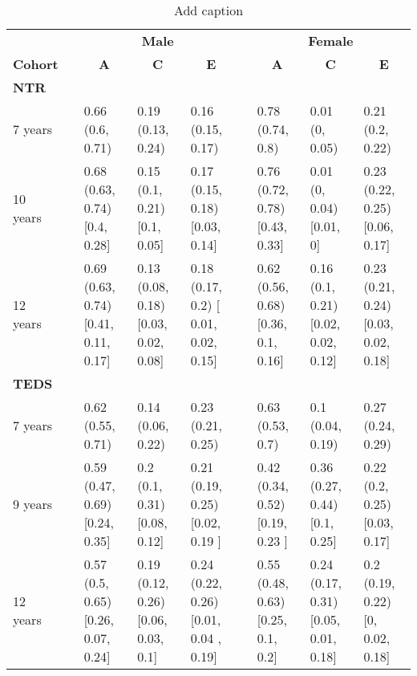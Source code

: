 \begin{table}[htbp]
  \centering
  \caption{Add caption}
    \begin{tabular}{lrlllrlll}
    \toprule
          &       & \multicolumn{3}{c}{\textbf{Male}} &       & \multicolumn{3}{c}{\textbf{Female}} \\
\cmidrule{3-5}\cmidrule{7-9}    \multicolumn{1}{c}{\textbf{Cohort}} &       & \multicolumn{1}{c}{\textbf{A}} & \multicolumn{1}{c}{\textbf{C}} & \multicolumn{1}{c}{\textbf{E}} &       & \multicolumn{1}{c}{\textbf{A}} & \multicolumn{1}{c}{\textbf{C}} & \multicolumn{1}{c}{\textbf{E}} \\
    \midrule
    \multicolumn{9}{l}{\textbf{NTR}} \\
    7 years &       & 0.66 (0.6, 0.71)  & 0.19 (0.13, 0.24)  & 0.16 (0.15, 0.17)  &       & 0.78 (0.74, 0.8)  & 0.01 (0, 0.05)  & 0.21 (0.2, 0.22)  \\
    10 years &       & 0.68 (0.63, 0.74)     [0.4, 0.28] & 0.15 (0.1, 0.21) [0.1, 0.05] & 0.17 (0.15, 0.18) [0.03, 0.14] &       & 0.76 (0.72, 0.78) [0.43, 0.33] & 0.01 (0, 0.04) [0.01, 0] & 0.23 (0.22, 0.25) [0.06, 0.17] \\
    12 years &       & 0.69 (0.63, 0.74) [0.41, 0.11, 0.17] & 0.13 (0.08, 0.18) [0.03, 0.02, 0.08] & 0.18 (0.17, 0.2) [ 0.01, 0.02, 0.15] &       & 0.62 (0.56, 0.68) [0.36, 0.1, 0.16] & 0.16 (0.1, 0.21) [0.02, 0.02, 0.12] & 0.23 (0.21, 0.24) [0.03, 0.02, 0.18] \\
    \multicolumn{9}{l}{\textbf{TEDS}} \\
    7 years &       & 0.62 (0.55, 0.71)  & 0.14 (0.06, 0.22) & 0.23 (0.21, 0.25) &       & 0.63 (0.53, 0.7) & 0.1 (0.04, 0.19) & 0.27 (0.24, 0.29) \\
    9 years &       & 0.59 (0.47, 0.69) [0.24, 0.35] & 0.2 (0.1, 0.31) [0.08, 0.12] & 0.21 (0.19, 0.25) [0.02, 0.19 ] &       & 0.42 (0.34, 0.52) [0.19, 0.23 ] & 0.36 (0.27, 0.44) [0.1, 0.25] & 0.22 (0.2, 0.25) [0.03, 0.17] \\
    12 years &       & 0.57 (0.5, 0.65) [0.26, 0.07, 0.24] & 0.19 (0.12, 0.26) [0.06, 0.03, 0.1] & 0.24 (0.22, 0.26) [0.01, 0.04 , 0.19] &       & 0.55 (0.48, 0.63) [0.25, 0.1, 0.2] & 0.24 (0.17, 0.31) [0.05, 0.01, 0.18] & 0.2 (0.19, 0.22)  [0, 0.02, 0.18] \\
    \bottomrule
    \end{tabular}%
  \label{tab:addlabel}%
\end{table}%
